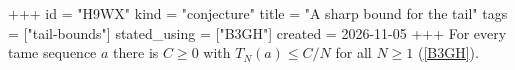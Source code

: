 +++
id = "H9WX"
kind = "conjecture"
title = "A sharp bound for the tail"
tags = ["tail-bounds"]
stated_using = ["B3GH"]
created = 2026-11-05
+++
For every tame sequence $a$ there is $C \ge 0$ with $T_N(a) \le C / N$ for all $N \ge 1$ (\ref{B3GH}).
